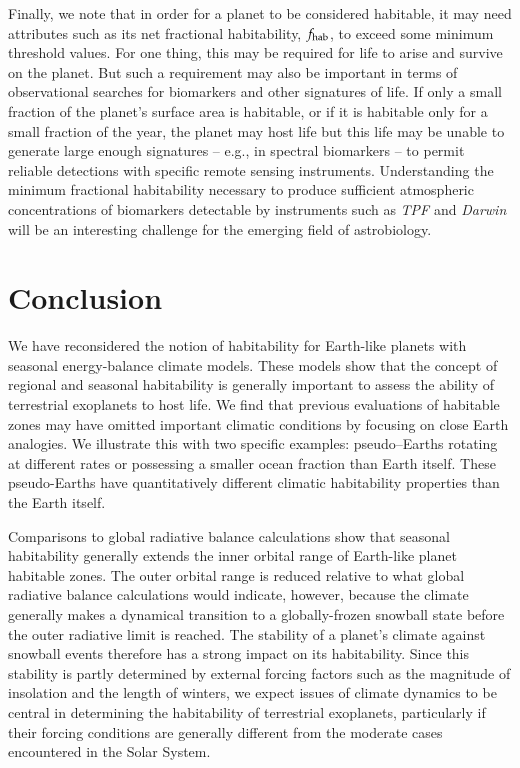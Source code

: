 Finally, we note that in order for a planet to be considered
habitable, it may need attributes such as its net fractional
habitability, $f_{\rm hab}$, to exceed some minimum threshold
values. For one thing, this may be required for life to arise and
survive on the planet. But such a requirement may also be important in
terms of observational searches for biomarkers and other signatures of
life.  If only a small fraction of the planet's surface area is
habitable, or if it is habitable only for a small fraction of the
year, the planet may host life but this life may be unable to generate
large enough signatures -- e.g., in spectral biomarkers
\citep{kaltenegger+selsis2007,kiang_et_al2007,grenfell_et_al2007,seager_et_al2005}
-- to permit reliable detections with specific remote sensing
instruments. Understanding the minimum fractional habitability
necessary to produce sufficient atmospheric concentrations of
biomarkers detectable by instruments such as \textsl{TPF} and
\textsl{Darwin} will be an interesting challenge for the emerging
field of astrobiology.


\section{Conclusion}
\label{hab_sec:conc}

We have reconsidered the notion of habitability for Earth-like planets
with seasonal energy-balance climate models. These models show that
the concept of regional and seasonal habitability is generally
important to assess the ability of terrestrial exoplanets to host
life. We find that previous evaluations of habitable zones may have
omitted important climatic conditions by focusing on close Earth
analogies. We illustrate this with two specific examples:
pseudo--Earths rotating at different rates or possessing a smaller
ocean fraction than Earth itself. These pseudo-Earths have
quantitatively different climatic habitability properties than the
Earth itself.

Comparisons to global radiative balance calculations show that
seasonal habitability generally extends the inner orbital range of
Earth-like planet habitable zones. The outer orbital range is reduced
relative to what global radiative balance calculations would indicate,
however, because the climate generally makes a dynamical transition to
a globally-frozen snowball state before the outer radiative limit is
reached. The stability of a planet's climate against snowball events
therefore has a strong impact on its habitability. Since this
stability is partly determined by external forcing factors such as the
magnitude of insolation and the length of winters, we expect issues of
climate dynamics to be central in determining the habitability of
terrestrial exoplanets, particularly if their forcing conditions are
generally different from the moderate cases encountered in the Solar
System.



